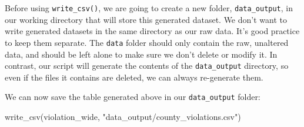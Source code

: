 \documentclass[
]{book}
\newenvironment{Shaded}{\begin{snugshade}}{\end{snugshade}}
\newcommand{\FunctionTok}[1]{\textcolor[rgb]{0.00,0.00,0.00}{#1}}
\newcommand{\NormalTok}[1]{#1}
\newcommand{\StringTok}[1]{\textcolor[rgb]{0.31,0.60,0.02}{#1}}
\begin{document}
Before using \texttt{write\_csv()}, we are going to create a new folder, \texttt{data\_output},
in our working directory that will store this generated dataset. We don't want
to write generated datasets in the same directory as our raw data. It's good
practice to keep them separate. The \texttt{data} folder should only contain the raw,
unaltered data, and should be left alone to make sure we don't delete or modify
it. In contrast, our script will generate the contents of the \texttt{data\_output}
directory, so even if the files it contains are deleted, we can always
re-generate them.

We can now save the table generated above in our \texttt{data\_output}
folder:

\begin{Shaded}
\begin{Highlighting}[]
\FunctionTok{write\_csv}\NormalTok{(violation\_wide, }\StringTok{"data\_output/county\_violations.csv"}\NormalTok{)}
\end{Highlighting}
\end{Shaded}


  
\end{document}
